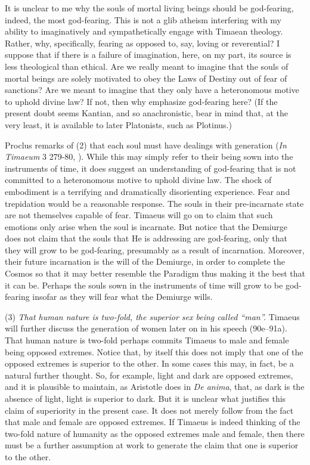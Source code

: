 It is unclear to me why the souls of mortal living beings should be god-fearing, indeed, the most god-fearing. This is not a glib atheism interfering with my ability to imaginatively and sympathetically engage with Timaean theology. Rather, why, specifically, fearing as opposed to, say, loving or reverential? I suppose that if there is a failure of imagination, here, on my part, its source is less theological than ethical. Are we really meant to imagine that the souls of mortal beings are solely motivated to obey the Laws of Destiny out of fear of sanctions? Are we meant to imagine that they only have a heteronomous motive to uphold divine law? If not, then why emphasize god-fearing here? (If the present doubt seems Kantian, and so anachronistic, bear in mind that, at the very least, it is available to later Platonists, such as Plotinus.)

Proclus remarks of (2) that each soul must have dealings with generation (\emph{In Timaeum} 3 279-80, \citealt{Diehl:1903re}). While this may simply refer to their being sown into the instruments of time, it does suggest an understanding of god-fearing that is not committed to a heteronomous motive to uphold divine law. The shock of embodiment is a terrifying and dramatically disorienting experience. Fear and trepidation would be a reasonable response. The souls in their pre-incarnate state are not themselves capable of fear. Timaeus will go on to claim that such emotions only arise when the soul is incarnate. But notice that the Demiurge does not claim that the souls that He is addressing are god-fearing, only that they will grow to be god-fearing, presumably as a result of incarnation. Moreover, their future incarnation is the will of the Demiurge, in order to complete the Cosmos so that it may better resemble the Paradigm thus making it the best that it can be. Perhaps the souls sown in the instruments of time will grow to be god-fearing insofar as they will fear what the Demiurge wills.

(3) \emph{That human nature is two-fold, the superior sex being called ``man''.} Timaeus will further discuss the generation of women later on in his speech (90e--91a). That human nature is two-fold perhaps commits Timaeus to male and female being opposed extremes. Notice that, by itself this does not imply that one of the opposed extremes is superior to the other. In some cases this may, in fact, be a natural further thought. So, for example, light and dark are opposed extremes, and it is plausible to maintain, as Aristotle does in \emph{De anima}, that, as dark is the absence of light, light is superior to dark. But it is unclear what justifies this claim of superiority in the present case. It does not merely follow from the fact that male and female are opposed extremes. If Timaeus is indeed thinking of the two-fold nature of humanity as the opposed extremes male and female, then there must be a further assumption at work to generate the claim that one is superior to the other.

